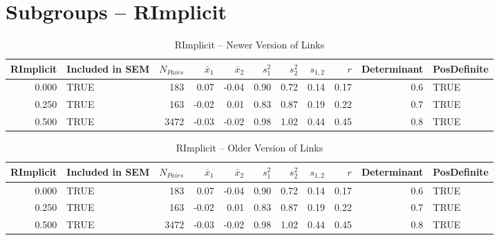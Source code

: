 \documentclass{article}\usepackage[]{graphicx}\usepackage[]{color}
\begin{document}
\section{Subgroups --  RImplicit }%
\begin{table}[ht]
\centering
\begin{tabular}{rlrrrrrrrrl}
  \hline
RImplicit & Included in SEM & $N_{Pairs}$ & $\bar{x}_1$ & $\bar{x}_2$ & $s_1^2$ & $s_2^2$ & $s_{1,2}$ & $r$ & Determinant & PosDefinite \\ 
  \hline
0.000 & TRUE & 183 & 0.07 & -0.04 & 0.90 & 0.72 & 0.14 & 0.17 & 0.6 & TRUE \\ 
  0.250 & TRUE & 163 & -0.02 & 0.01 & 0.83 & 0.87 & 0.19 & 0.22 & 0.7 & TRUE \\ 
  0.500 & TRUE & 3472 & -0.03 & -0.02 & 0.98 & 1.02 & 0.44 & 0.45 & 0.8 & TRUE \\ 
   \hline
\end{tabular}
\caption{RImplicit -- Newer Version of Links} 
\end{table}
\begin{table}[ht]
\centering
\begin{tabular}{rlrrrrrrrrl}
  \hline
RImplicit & Included in SEM & $N_{Pairs}$ & $\bar{x}_1$ & $\bar{x}_2$ & $s_1^2$ & $s_2^2$ & $s_{1,2}$ & $r$ & Determinant & PosDefinite \\ 
  \hline
0.000 & TRUE & 183 & 0.07 & -0.04 & 0.90 & 0.72 & 0.14 & 0.17 & 0.6 & TRUE \\ 
  0.250 & TRUE & 163 & -0.02 & 0.01 & 0.83 & 0.87 & 0.19 & 0.22 & 0.7 & TRUE \\ 
  0.500 & TRUE & 3472 & -0.03 & -0.02 & 0.98 & 1.02 & 0.44 & 0.45 & 0.8 & TRUE \\ 
   \hline
\end{tabular}
\caption{RImplicit -- Older Version of Links} 
\end{table}
\end{document}
